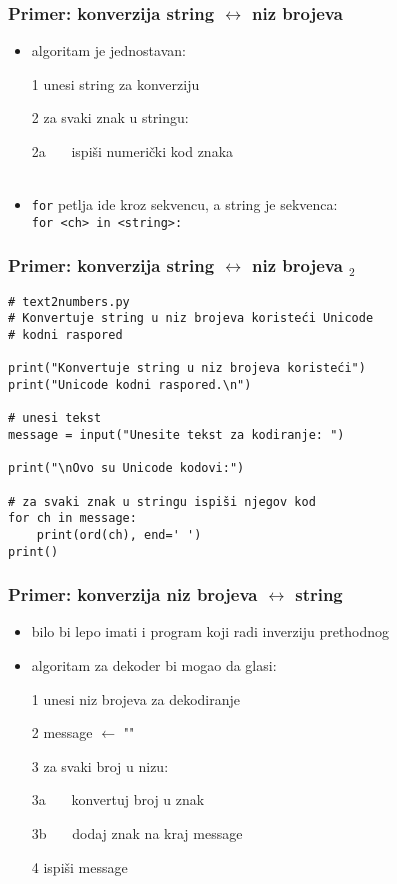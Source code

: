 \documentclass[utf8,compress,aspectratio=169]{beamer}
\begin{document}
\begin{frame}[fragile]
  \frametitle{Primer: konverzija string $\leftrightarrow$ niz brojeva}
  \begin{itemize}
    \item algoritam je jednostavan:
    \item[1] unesi string za konverziju
    \item[2] za svaki znak u stringu:
    \item[2a] \ \ \ ispiši numerički kod znaka \\ \ \\ %
    \item \texttt{for} petlja ide kroz sekvencu, a string je sekvenca: \\
      \texttt{for <ch> in <string>:}
  \end{itemize}
\end{frame}

\begin{frame}[fragile,shrink=10]
  \frametitle{Primer: konverzija string $\leftrightarrow$ niz brojeva $_2$}
\begin{verbatim}
# text2numbers.py
# Konvertuje string u niz brojeva koristeći Unicode
# kodni raspored

print("Konvertuje string u niz brojeva koristeći")
print("Unicode kodni raspored.\n")

# unesi tekst
message = input("Unesite tekst za kodiranje: ")

print("\nOvo su Unicode kodovi:")

# za svaki znak u stringu ispiši njegov kod
for ch in message:
    print(ord(ch), end=' ')
print()
\end{verbatim}
\end{frame}

\begin{frame}[fragile]
  \frametitle{Primer: konverzija niz brojeva $\leftrightarrow$ string}
  \begin{itemize}
    \item bilo bi lepo imati i program koji radi inverziju prethodnog
    \item algoritam za dekoder bi mogao da glasi:
    \item[1] unesi niz brojeva za dekodiranje
    \item[2] message $\leftarrow$ ""
    \item[3] za svaki broj u nizu:
    \item[3a] \ \ \ konvertuj broj u znak
    \item[3b] \ \ \ dodaj znak na kraj message
    \item[4] ispiši message
  \end{itemize}
\end{frame}
\end{document}
